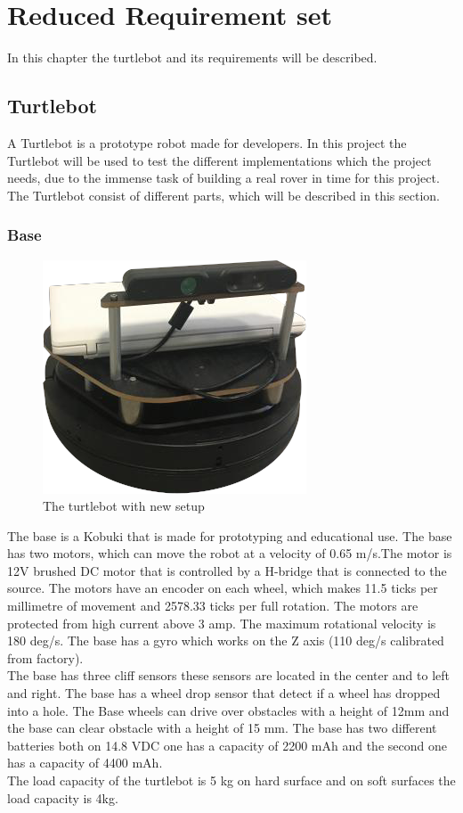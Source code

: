 \chapter{Reduced Requirement set} \label{ch:Reduced Requirement Set}
In this chapter the turtlebot and its requirements will be described.

\section{Turtlebot} %
A Turtlebot is a prototype robot made for developers. In this project the Turtlebot will be used to test the different implementations which the project needs, due to the immense task of building a real rover in time for this project.\\
The Turtlebot consist of different parts, which will be described in this section.

\subsection{Base} %
\begin{figure}[h]
    \centering
    \includegraphics[width=.5\textwidth]{figures/turtlebot001.png}
    \caption{The turtlebot with new setup} 
    \label{fig:turtlebot} 
\end{figure}
The base is a Kobuki that is made for prototyping and educational use. The base has two motors, which can move the robot at a velocity of 0.65 m/s.The motor is 12V brushed DC motor that is controlled by a H-bridge that is connected to the source. The motors have an encoder on each wheel, which makes 11.5 ticks per millimetre of movement and 2578.33 ticks per full rotation. The motors are protected from high current above 3 amp. The maximum rotational velocity is 180 deg/s. The base has a gyro which works on the Z axis (110 deg/s calibrated from factory).\\
The base has three cliff sensors these sensors are located in the center and to left and right. The base has a wheel drop sensor that detect if a wheel has dropped into a hole. The Base wheels can drive over obstacles with a height of 12mm and the base can clear obstacle with a height of 15 mm. The base has two different batteries both on 14.8 VDC one has a capacity of 2200 mAh and the second one has a capacity of 4400 mAh.\\ 
The load capacity of the turtlebot is 5 kg on hard surface and on soft surfaces the load capacity is 4kg\cite{Base}.

